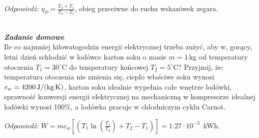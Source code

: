 \documentclass[11pt,a4paper]{article}
\newcounter{zaddom}\newcommand{\zaddom}[1][]{\addtocounter{zaddom}{1} ~\\  {\bf \emph{Zadanie domowe \arabic{zaddom} #1 }} \\}
\begin{document}
{\it Odpowiedź:} $\eta_P = \frac{T_2 +T_1}{T_2 - T_1}$, obieg przeciwne do ruchu wskazówek zegara. 

\vspace*{5mm}
\zaddom
Ile co najmniej kilowatogodzin energii elektrycznej trzeba zużyć, aby w, gorący, 
letni dzień schłodzić w lodówce karton soku o masie $m=1\,$kg
od temperatury otoczenia $T_1=30^\circ$C do temperatury końcowej $T_2=5^\circ$C?
Przyjmij, że:
temperatura otoczenia nie zmienia się, ciepło właściwe soku wynosi $c_{w}=4200\,{\rm J/(kg\, K)}$,
karton soku idealnie wypełnia całe wnętrze lodówki,
sprawność konwersji energii elektrycznej na mechaniczną w kompresorze idealnej lodówki wynosi 100\%, 
a lodówka pracuje w chłodniczym cyklu Carnot.

{\it Odpowiedź:} $W=mc_{w}[(T_1 \ln(\frac{T_1}{T_2}) + T_2-T_1)] = 1.27 \cdot 10^{-3}$~kWh.
\end{document}
